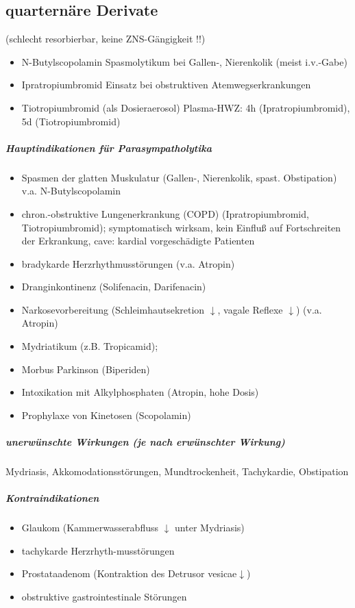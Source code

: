 \documentclass[10pt,a4paper]{report}
\begin{document}
\subsection{quarternäre Derivate}(schlecht resorbierbar, keine ZNS-Gängigkeit !!)
\begin{itemize}
	\item N-Butylscopolamin	Spasmolytikum bei Gallen-, Nierenkolik (meist i.v.-Gabe)
	\item Ipratropiumbromid	Einsatz bei obstruktiven Atemwegserkrankungen
	\item Tiotropiumbromid	(als Dosieraerosol) Plasma-HWZ: 4h (Ipratropiumbromid), 5d (Tiotropiumbromid)
\end{itemize}
\subparagraph{Hauptindikationen für Parasympatholytika}
\begin{itemize}
	\item Spasmen der glatten Muskulatur (Gallen-, Nierenkolik, spast. Obstipation)
	v.a. N-Butylscopolamin
	\item chron.-obstruktive Lungenerkrankung (COPD) (Ipratropiumbromid, Tiotropiumbromid); symptomatisch wirksam, kein Einfluß auf Fortschreiten der Erkrankung, cave: kardial vorgeschädigte Patienten
	\item bradykarde Herzrhythmusstörungen (v.a. Atropin)
	\item Dranginkontinenz (Solifenacin, Darifenacin)
	\item Narkosevorbereitung (Schleimhautsekretion $\downarrow$, vagale Reflexe $\downarrow$) (v.a. Atropin)
	\item Mydriatikum (z.B. Tropicamid); 
	\item Morbus Parkinson (Biperiden)
	\item Intoxikation mit Alkylphosphaten (Atropin, hohe Dosis) 
	\item Prophylaxe von Kinetosen (Scopolamin) 
\end{itemize}
\subparagraph{unerwünschte Wirkungen (je nach erwünschter Wirkung)}
Mydriasis, Akkomodationsstörungen, Mundtrockenheit, Tachykardie, Obstipation 
\subparagraph{Kontraindikationen}
\begin{itemize}
	\item Glaukom (Kammerwasserabfluss $\downarrow$ unter Mydriasis)  
	\item tachykarde Herzrhyth-musstörungen  
	\item Prostataadenom (Kontraktion des Detrusor vesicae$\downarrow$) 
	\item obstruktive gastrointestinale Störungen
\end{itemize}
\end{document}
